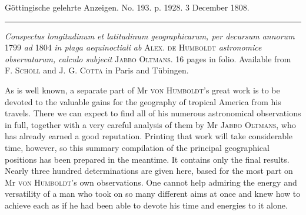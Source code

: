 \clearpage
{}
\hypertarget{native-514-lower}{}\label{native-514-lower}
\begin{center}\small Göttingische gelehrte Anzeigen. No. 193. p. 1928. 3 December 1808.\\[3pt]\rule{.72\linewidth}{.3pt}\end{center}

\emph{Conspectus longitudinum et latitudinum geographicarum, per decursum annorum} 1799 \emph{ad} 1804 \emph{in plaga aequinoctiali ab} \textsc{Alex. de Humboldt} \emph{astronomice observatarum, calculo subjecit} \textsc{Jabbo Oltmans}. 16 pages in folio. Available from \textsc{F. Schöll} and \textsc{J. G. Cotta} in Paris and Tübingen.

As is well known, a separate part of Mr \textsc{von Humboldt}’s great work is to be devoted to the valuable gains for the geography of tropical America from his travels. There we can expect to find all of his numerous astronomical observations in full, together with a very careful analysis of them by Mr \textsc{Jabbo Oltmans}, who has already earned a good reputation. Printing that work will take considerable time, however, so this summary compilation of the principal geographical positions has been prepared in the meantime. It contains only the final results. Nearly three hundred determinations are given here, based for the most part on Mr \textsc{von Humboldt}’s own observations. One cannot help admiring the energy and versatility of a man who took on so many different aims at once and knew how to achieve each as if he had been able to devote his time and energies to it alone.

